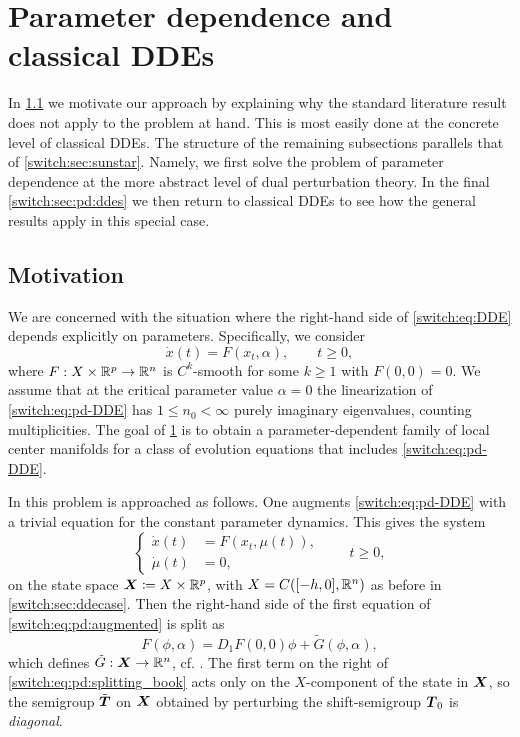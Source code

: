 \section{Parameter dependence and classical DDEs}\label{switch:sec:pd}
In \cref{switch:sec:pd:motivation} we motivate our approach by explaining why the standard literature result does not apply to the problem at hand. This is most easily done at the concrete level of classical DDEs. The structure of the remaining subsections parallels that of \cref{switch:sec:sunstar}. Namely, we first solve the problem of parameter dependence at the more abstract level of dual perturbation theory. In the final \cref{switch:sec:pd:ddes} we then return to classical DDEs to see how the general results apply in this special case.

\subsection{Motivation}\label{switch:sec:pd:motivation}
We are concerned with the situation where the right-hand side of \cref{switch:eq:DDE} depends explicitly on parameters. Specifically, we consider
%
\begin{equation}
  \label{switch:eq:pd-DDE}
  \dot{x}(t)= F(x_t, \alpha), \qquad t \ge 0,
\end{equation}
%
where $F: X \times \mathbb{R}^p \to \mathbb{R}^n$ is $C^k$-smooth for some $k \ge 1$ with $F(0,0) = 0$. We assume that at the critical parameter value $\alpha = 0$ the linearization of \cref{switch:eq:pd-DDE} has $1 \le n_0 < \infty$ purely imaginary eigenvalues, counting multiplicities. The goal of \cref{switch:sec:pd} is to obtain a parameter-dependent family of local center manifolds for a class of evolution equations that includes \cref{switch:eq:pd-DDE}.

In \cite[Section IX.9.1]{diekmann1995delay} this problem is approached as follows. One augments \cref{switch:eq:pd-DDE} with a trivial equation for the constant parameter dynamics. This gives the system
\begin{equation}
  \label{switch:eq:pd:augmented}
  \left\{
    \begin{aligned}
      \dot{x}(t) &= F(x_t,\mu(t)),\\
      \dot{\mu}(t) &= 0,
    \end{aligned}
  \right.
  \qquad t \ge 0,
\end{equation}
on the state space $\boldsymbol{X} \coloneqq X \times \mathbb{R}^p$, with $X = C([-h,0],\mathbb{R}^n)$ as before in \cref{switch:sec:ddecase}. Then the right-hand side of the first equation of \cref{switch:eq:pd:augmented} is split as
\begin{equation}
  \label{switch:eq:pd:splitting_book}
  F(\phi,\alpha) = D_1F(0,0)\phi + \tilde{G}(\phi,\alpha),
\end{equation}
which defines $\tilde{G} : \boldsymbol{X} \to \mathbb{R}^n$, cf. \cite[(9.7) in Section IX.9.1]{diekmann1995delay}. The first term on the right of \cref{switch:eq:pd:splitting_book} acts only on the $X$-component of the state in $\boldsymbol{X}$, so the semigroup $\tilde{\boldsymbol{T}}$ on $\boldsymbol{X}$ obtained by perturbing the shift-semigroup $\boldsymbol{T}_0$ is \emph{diagonal}.


